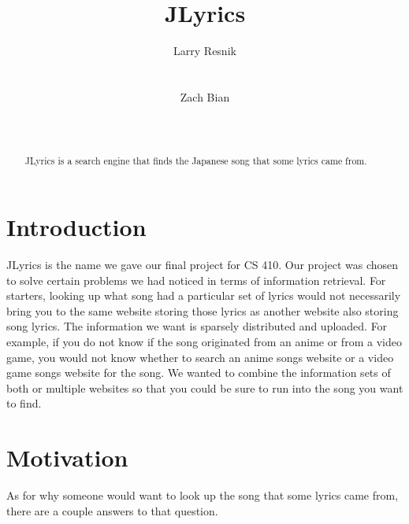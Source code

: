 \documentclass{acm} %
\begin{document}
\sloppy %
\begin{CJK}{UTF8}{zhsong}
\title{JLyrics}

\author{%
    \alignauthor Larry Resnik \\
    \\
    \\
    \alignauthor Zach Bian\\
    \\
    \\
}
\maketitle

\begin{abstract}
JLyrics is a search engine that finds the Japanese song that some lyrics came from.
\end{abstract}


\section{Introduction}

JLyrics is the name we gave our final project for CS 410. Our project was chosen to solve certain problems we had noticed in terms of information retrieval. For starters, looking up what song had a particular set of lyrics would not necessarily bring you to the same website storing those lyrics as another website also storing song lyrics. The information we want is sparsely distributed and uploaded. For example, if you do not know if the song originated from an anime or from a video game, you would not know whether to search an anime songs website or a video game songs website for the song. We wanted to combine the information sets of both or multiple websites so that you could be sure to run into the song you want to find.

\section{Motivation}

As for why someone would want to look up the song that some lyrics came from, there are a couple answers to that question.


\end{CJK}
\end{document}
